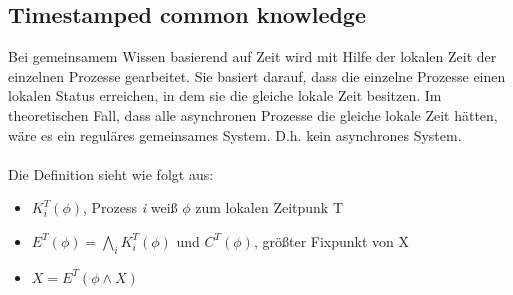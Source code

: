 \subsection{Timestamped common knowledge}
\label{timestamped_comm_know}
Bei gemeinsamem Wissen basierend auf Zeit wird mit Hilfe der lokalen Zeit der einzelnen Prozesse gearbeitet. Sie basiert darauf, dass die einzelne Prozesse einen lokalen Status erreichen, in dem sie die gleiche lokale Zeit besitzen. Im theoretischen Fall, dass alle asynchronen Prozesse die gleiche lokale Zeit hätten, wäre es ein reguläres gemeinsames System. D.h. kein asynchrones System. \\\\
Die Definition sieht wie folgt aus:
\begin{itemize}
			\item $K^T_i(\phi)$, Prozess \textit{i} weiß $\phi$ zum lokalen Zeitpunk T
			\item $E^T(\phi) = \bigwedge_i K^T_i(\phi) $ und $C^T(\phi)$, größter Fixpunkt von X
			\item $X=E^T(\phi \wedge X)$

		\end{itemize}
